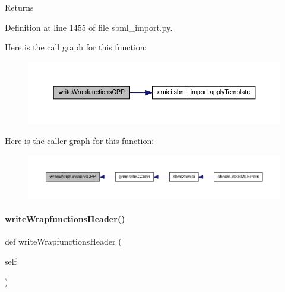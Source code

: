 \begin{DoxyReturn}{Returns}

\end{DoxyReturn}


Definition at line 1455 of file sbml\+\_\+import.\+py.

Here is the call graph for this function\+:
\nopagebreak
\begin{figure}[H]
\begin{center}
\leavevmode
\includegraphics[width=350pt]{classamici_1_1sbml__import_1_1_sbml_importer_a2ba24adc6b9fafdf99f5acd200acf17a_cgraph}
\end{center}
\end{figure}
Here is the caller graph for this function\+:
\nopagebreak
\begin{figure}[H]
\begin{center}
\leavevmode
\includegraphics[width=350pt]{classamici_1_1sbml__import_1_1_sbml_importer_a2ba24adc6b9fafdf99f5acd200acf17a_icgraph}
\end{center}
\end{figure}
\mbox{\label{classamici_1_1sbml__import_1_1_sbml_importer_ad16157bcd165452e4ff9aa9d6f12b907}} 
\paragraph{\texorpdfstring{write\+Wrapfunctions\+Header()}{writeWrapfunctionsHeader()}}
{\footnotesize\ttfamily def write\+Wrapfunctions\+Header (\begin{DoxyParamCaption}\item[{}]{self }\end{DoxyParamCaption})}

